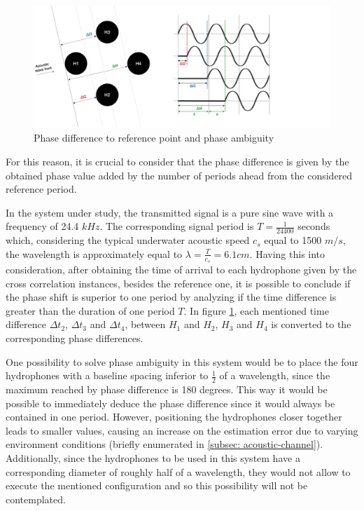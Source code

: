 \begin{figure}[!htbp]
	\centering
	\includegraphics[width=1.2\textwidth]{figures/phase-diff}
	\caption{Phase difference to reference point and phase ambiguity}
	\label{fig:phasediff}
\end{figure}

For this reason, it is crucial to consider that the phase difference is given by the obtained phase value added by the number of periods ahead from the considered reference period.

In the system under study, the transmitted signal is a pure sine wave with a frequency of 24.4 $kHz$. The corresponding signal period is $T = \frac{1}{24400} $ seconds which, considering the typical underwater acoustic speed $c_s$ equal to 1500 $m/s$, the wavelength is approximately equal to $\lambda = \frac{T}{c_s} = 6.1 cm$. Having this into consideration, after obtaining the time of arrival to each hydrophone given by the cross correlation instances, besides the reference one, it is possible to conclude if the phase shift is superior to one period by analyzing if the time difference is greater than the duration of one period $T$. In figure \ref{fig:phasediff}, each mentioned time difference $\Delta t_2$, $\Delta t_3$ and $\Delta t_4$, between $H_1$ and $H_2$, $H_3$ and $H_4$ is converted to the corresponding phase differences.

One possibility to solve phase ambiguity in this system would be to place the four hydrophones with a baseline spacing inferior to $\frac{1}{2}$ of a wavelength, since the maximum reached by phase difference is 180 degrees. This way it would be possible to immediately deduce the phase difference since it would always be contained in one period. However, positioning the hydrophones closer together leads to smaller  values, causing an increase on the estimation error due to varying environment conditions (briefly enumerated in \ref{subsec: acoustic-channel}). Additionally, since the hydrophones to be used in this system have a corresponding diameter of roughly half of a wavelength, they would not allow to execute the mentioned configuration and so this possibility will not be contemplated.

